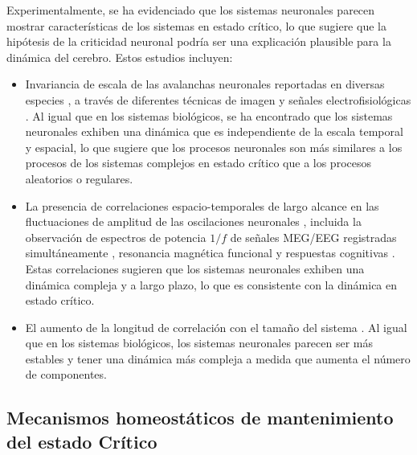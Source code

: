 Experimentalmente, se ha evidenciado que los sistemas neuronales parecen mostrar características de los sistemas en estado crítico, lo que sugiere que la hipótesis de la criticidad neuronal podría ser una explicación plausible para la dinámica del cerebro. Estos estudios incluyen:

\begin{itemize}
\item Invariancia de escala de las avalanchas neuronales \cite{fontenele_criticality_2019,beggs_neuronal_2003,beggs_neuronal_2004}  reportadas en diversas especies \cite{hahn_neuronal_2010,petermann_spontaneous_2009,shriki_neuronal_2013}, a través de diferentes técnicas de imagen \cite{tagliazucchi_criticality_2012} y señales electrofisiológicas \cite{linkenkaer-hansen_long-range_2001}. Al igual que en los sistemas biológicos, se ha encontrado que los sistemas neuronales exhiben una dinámica que es independiente de la escala temporal y espacial, lo que sugiere que los procesos neuronales son más similares a los procesos de los sistemas complejos en estado crítico que a los procesos aleatorios o regulares.
\item La presencia de correlaciones espacio-temporales de largo alcance en las fluctuaciones de amplitud de las oscilaciones neuronales \cite{expert_self-similar_2010,fraiman_what_2012,kitzbichler_broadband_2009}, incluida la observación de espectros de potencia $1/f$ de señales \acrshort{MEG}/\acrshort{EEG} registradas simultáneamente \cite{linkenkaer-hansen_long-range_2001}, resonancia magnética funcional  \cite{kitzbichler_broadband_2009} y respuestas cognitivas  \cite{van_orden_human_2005,shew_adaptation_2015}. Estas correlaciones sugieren que los sistemas neuronales exhiben una dinámica compleja y a largo plazo, lo que es consistente con la dinámica en estado crítico.
\item El aumento de la longitud de correlación con el tamaño del sistema \cite{fraiman_what_2012,ribeiro_trial-by-trial_2022,haimovici_brain_2013}. Al igual que en los sistemas biológicos, los sistemas neuronales parecen ser más estables y tener una dinámica más compleja a medida que aumenta el número de componentes.
\end{itemize}




\subsection{Mecanismos homeostáticos de mantenimiento  del estado Crítico}

